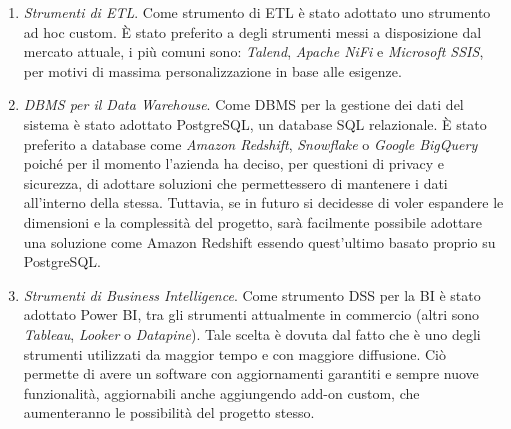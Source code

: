 \begin{enumerate}
    \item \textit{Strumenti di ETL}. Come strumento di ETL è stato adottato uno strumento ad hoc custom. È stato preferito a degli strumenti messi a disposizione dal mercato attuale, i più comuni sono: \textit{Talend}, \textit{Apache NiFi} e \textit{Microsoft SSIS}, per motivi di massima personalizzazione in base alle esigenze.
    \item \textit{DBMS per il Data Warehouse}. Come DBMS per la gestione dei dati del sistema è stato adottato PostgreSQL, un database SQL relazionale. È stato preferito a database come \textit{Amazon Redshift}, \textit{Snowflake} o \textit{Google BigQuery} poiché per il momento l'azienda ha deciso, per questioni di privacy e sicurezza, di adottare soluzioni che permettessero di mantenere i dati all'interno della stessa. Tuttavia, se in futuro si decidesse di voler espandere le dimensioni e la complessità del progetto, sarà facilmente possibile adottare una soluzione come Amazon Redshift essendo quest'ultimo basato proprio su PostgreSQL.
    \item \textit{Strumenti di Business Intelligence}. Come strumento DSS per la BI è stato adottato Power BI, tra gli strumenti attualmente in commercio (altri sono \textit{Tableau}, \textit{Looker} o \textit{Datapine}). Tale scelta è dovuta dal fatto che è uno degli strumenti utilizzati da maggior tempo e con maggiore diffusione. Ciò permette di avere un software con aggiornamenti garantiti e sempre nuove funzionalità, aggiornabili anche aggiungendo add-on custom, che aumenteranno le possibilità del progetto stesso.
\end{enumerate}

